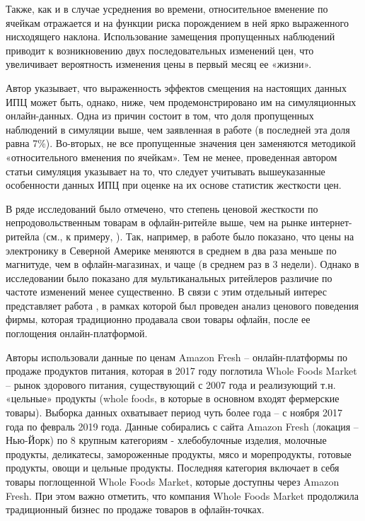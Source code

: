 Также, как и в случае усреднения во времени, относительное вменение по ячейкам отражается и на функции риска порождением в ней ярко выраженного нисходящего наклона. Использование замещения пропущенных наблюдений приводит к возникновению двух последовательных изменений цен, что увеличивает вероятность изменения цены в первый месяц ее «жизни». 

Автор указывает, что выраженность эффектов смещения на настоящих данных ИПЦ может быть, однако, ниже, чем продемонстрировано им на симуляционных онлайн-данных. Одна из причин состоит в том, что доля пропущенных наблюдений в симуляции выше, чем заявленная в работе \cite{klenow2008state} (в последней эта доля равна 7\%). Во-вторых, не все пропущенные значения цен заменяются методикой «относительного вменения по ячейкам». Тем не менее, проведенная автором статьи симуляция указывает на то, что следует учитывать вышеуказанные особенности данных ИПЦ при оценке на их основе статистик жесткости цен.

В ряде исследований было отмечено, что степень ценовой жесткости по непродовольственным товарам в офлайн-ритейле выше, чем на рынке интернет-ритейла (см., к примеру, \cite{gorodnichenko2018price, gorodnichenko2017price}). Так, например, в работе \cite{gorodnichenko2017price} было показано, что цены на электронику в Северной Америке меняются в среднем в два раза меньше по магнитуде, чем в офлайн-магазинах, и чаще (в среднем раз в 3 недели). Однако в исследовании \cite{cavallo2016online} было показано для мультиканальных ритейлеров различие по частоте изменений менее существенно. В связи с этим отдельный интерес представляет работа \cite{HILLEN202163}, в рамках которой был проведен анализ ценового поведения фирмы, которая традиционно продавала свои товары офлайн, после ее поглощения онлайн-платформой.

Авторы использовали данные по ценам Amazon Fresh – онлайн-платформы по продаже продуктов питания, которая в 2017 году поглотила Whole Foods Market – рынок здорового питания, существующий с 2007 года и реализующий т.н. «цельные» продукты (whole foods, в которые в основном входят фермерские товары). Выборка данных охватывает период чуть более года – с ноября 2017 года по февраль 2019 года. Данные собирались с сайта Amazon Fresh (локация – Нью-Йорк) по 8 крупным категориям - хлебобулочные изделия, молочные продукты, деликатесы, замороженные продукты, мясо и морепродукты, готовые продукты, овощи и цельные продукты. Последняя категория включает в себя товары поглощенной Whole Foods Market, которые доступны через Amazon Fresh. При этом важно отметить, что компания Whole Foods Market продолжила традиционный бизнес по продаже товаров в офлайн-точках.

